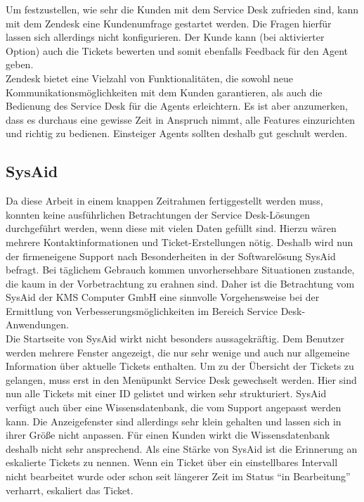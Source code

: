 Um festzustellen, wie sehr die Kunden mit dem Service Desk zufrieden sind, kann mit dem Zendesk eine Kundenumfrage gestartet werden. Die Fragen hierfür lassen sich allerdings nicht konfigurieren. Der Kunde kann (bei aktivierter Option) auch die Tickets bewerten und somit ebenfalls Feedback für den Agent geben.\\
Zendesk bietet eine Vielzahl von Funktionalitäten, die sowohl neue Kommunikationsmöglichkeiten mit dem Kunden garantieren, als auch die Bedienung des Service Desk für die Agents erleichtern. Es ist aber anzumerken, dass es durchaus eine gewisse Zeit in Anspruch nimmt, alle Features einzurichten und richtig zu bedienen. Einsteiger Agents sollten deshalb gut geschult werden.\\

\subsection{SysAid}
\noindent
Da diese Arbeit in einem knappen Zeitrahmen fertiggestellt werden muss, konnten keine ausführlichen Betrachtungen der Service Desk-Lösungen durchgeführt werden, wenn diese mit vielen Daten gefüllt sind. Hierzu wären mehrere Kontaktinformationen und Ticket-Erstellungen nötig. Deshalb wird nun der firmeneigene Support nach Besonderheiten in der Softwarelösung SysAid befragt. Bei täglichem Gebrauch kommen unvorhersehbare Situationen zustande, die kaum in der Vorbetrachtung zu erahnen sind. Daher ist die Betrachtung vom SysAid der KMS Computer GmbH eine sinnvolle Vorgehensweise bei der Ermittlung von Verbesserungsmöglichkeiten im Bereich Service Desk-Anwendungen.\\
\noindent
Die Startseite von SysAid wirkt nicht besonders aussagekräftig. Dem Benutzer werden mehrere Fenster angezeigt, die nur sehr wenige und auch nur allgemeine Information über aktuelle Tickets enthalten. Um zu der Übersicht der Tickets zu gelangen, muss erst in den Menüpunkt Service Desk gewechselt werden. Hier sind nun alle Tickets mit einer ID gelistet und wirken sehr strukturiert. \newline
SysAid verfügt auch über eine Wissensdatenbank, die vom Support angepasst werden kann. Die Anzeigefenster sind allerdings sehr klein gehalten und lassen sich in ihrer Größe nicht anpassen. Für einen Kunden wirkt die Wissensdatenbank deshalb nicht sehr ansprechend.\newline
Als eine Stärke von SysAid ist die Erinnerung an eskalierte Tickets zu nennen. Wenn ein Ticket über ein einstellbares Intervall  nicht bearbeitet wurde oder schon seit längerer Zeit im Status \enquote{in Bearbeitung} verharrt, eskaliert das Ticket.\newline
